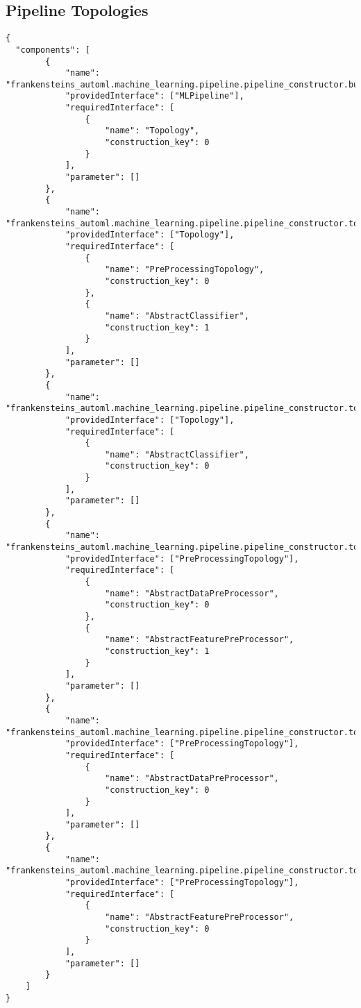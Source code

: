 \subsection{Pipeline Topologies}
\begin{Verbatim}[fontsize=\scriptsize]
{
  "components": [
        {
            "name": "frankensteins_automl.machine_learning.pipeline.pipeline_constructor.build_topology",
            "providedInterface": ["MLPipeline"],
            "requiredInterface": [
                {
                    "name": "Topology",
                    "construction_key": 0
                }
            ],
            "parameter": []
        },
        {
            "name": "frankensteins_automl.machine_learning.pipeline.pipeline_constructor.topology_union",
            "providedInterface": ["Topology"],
            "requiredInterface": [
                {
                    "name": "PreProcessingTopology",
                    "construction_key": 0
                },
                {
                    "name": "AbstractClassifier",
                    "construction_key": 1
                }
            ],
            "parameter": []
        },
        {
            "name": "frankensteins_automl.machine_learning.pipeline.pipeline_constructor.topology_union",
            "providedInterface": ["Topology"],
            "requiredInterface": [
                {
                    "name": "AbstractClassifier",
                    "construction_key": 0
                }
            ],
            "parameter": []
        },
        {
            "name": "frankensteins_automl.machine_learning.pipeline.pipeline_constructor.topology_union",
            "providedInterface": ["PreProcessingTopology"],
            "requiredInterface": [
                {
                    "name": "AbstractDataPreProcessor",
                    "construction_key": 0
                },
                {
                    "name": "AbstractFeaturePreProcessor",
                    "construction_key": 1
                }
            ],
            "parameter": []
        },
        {
            "name": "frankensteins_automl.machine_learning.pipeline.pipeline_constructor.topology_union",
            "providedInterface": ["PreProcessingTopology"],
            "requiredInterface": [
                {
                    "name": "AbstractDataPreProcessor",
                    "construction_key": 0
                }
            ],
            "parameter": []
        },
        {
            "name": "frankensteins_automl.machine_learning.pipeline.pipeline_constructor.topology_union",
            "providedInterface": ["PreProcessingTopology"],
            "requiredInterface": [
                {
                    "name": "AbstractFeaturePreProcessor",
                    "construction_key": 0
                }
            ],
            "parameter": []
        }
    ]
}
\end{Verbatim}

